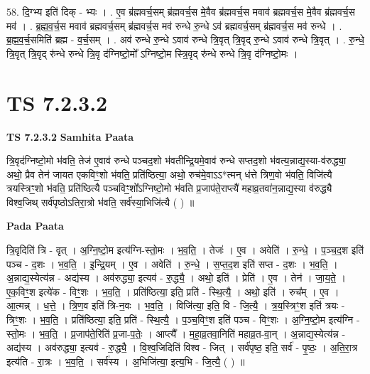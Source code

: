 \documentclass[17pt]{extarticle}
\begin{document}
58. दि॒ग्भ्य इति॑ दिक् - भ्यः । . ए॒व ब्र॑ह्मवर्च॒सम् ब्र॑ह्मवर्च॒स मे॒वैव ब्र॑ह्मवर्च॒स मवाव॑ ब्रह्मवर्च॒स मे॒वैव ब्र॑ह्मवर्च॒स मव॑ । . ब्र॒ह्म॒व॒र्च॒स मवाव॑ ब्रह्मवर्च॒सम् ब्र॑ह्मवर्च॒स मव॑ रुन्धे रु॒न्धे ऽव॑ ब्रह्मवर्च॒सम् ब्र॑ह्मवर्च॒स मव॑ रुन्धे । . ब्र॒ह्म॒व॒र्च॒समिति॑ ब्रह्म - व॒र्च॒सम् । . अव॑ रुन्धे रु॒न्धे ऽवाव॑ रुन्धे त्रि॒वृत् त्रि॒वृद् रु॒न्धे ऽवाव॑ रुन्धे त्रि॒वृत् । . रु॒न्धे॒ त्रि॒वृत् त्रि॒वृद् रु॑न्धे रुन्धे त्रि॒वृ द॑ग्निष्टो॒मो᳚ ऽग्निष्टो॒म स्त्रि॒वृद् रु॑न्धे रुन्धे त्रि॒वृ द॑ग्निष्टो॒मः । \newline
\pagebreak
{}

\section{ TS 7.2.3.2 }

\textbf{TS 7.2.3.2 } \newline
\textbf{Samhita Paata} \newline

त्रि॒वृद॑ग्निष्टो॒मो भ॑वति॒ तेज॑ ए॒वाव॑ रुन्धे पञ्चद॒शो भ॑वतीन्द्रि॒यमे॒वाव॑ रुन्धे सप्तद॒शो भ॑वत्य॒न्नाद्य॒स्या-व॑रुद्ध्या॒ अथो॒ प्रैव तेन॑ जायत एकविꣳ॒॒शो भ॑वति॒ प्रति॑ष्ठित्या॒ अथो॒ रुच॑मे॒वाऽऽ*त्मन् ध॑त्ते त्रिण॒वो भ॑वति॒ विजि॑त्यै त्रयस्त्रिꣳ॒॒शो भ॑वति॒ प्रति॑ष्ठित्यै पञ्चविꣳ॒॒शो᳚ऽग्निष्टो॒मो भ॑वति प्र॒जाप॑ते॒राप्त्यै॑ महाव्र॒तवा॑न॒न्नाद्य॒स्या व॑रुद्ध्यै विश्व॒जिथ् सर्व॑पृष्ठोऽतिरा॒त्रो भ॑वति॒ सर्व॑स्या॒भिजि॑त्यै ( ) ॥ \newline

\textbf{Pada Paata} \newline

त्रि॒वृदिति॑ त्रि - वृत् । अ॒ग्नि॒ष्टो॒म इत्य॑ग्नि-स्तो॒मः । भ॒व॒ति॒ । तेजः॑ । ए॒व । अवेति॑ । रु॒न्धे॒ । प॒ञ्च॒द॒श इति॑ पञ्च - द॒शः । भ॒व॒ति॒ । इ॒न्द्रि॒यम् । ए॒व । अवेति॑ । रु॒न्धे॒ । स॒प्त॒द॒श इति॑ सप्त - द॒शः । भ॒व॒ति॒ । अ॒न्नाद्य॒स्येत्य॑न्न - अद्य॑स्य । अव॑रुद्ध्या॒ इत्यव॑ - रु॒द्ध्यै॒ । अथो॒ इति॑ । प्रेति॑ । ए॒व । तेन॑ । जा॒य॒ते॒ । ए॒क॒विꣳ॒॒श इत्ये॑क - विꣳ॒॒शः । भ॒व॒ति॒ । प्रति॑ष्ठित्या॒ इति॒ प्रति॑ - स्थि॒त्यै॒ । अथो॒ इति॑ । रुच᳚म् । ए॒व । आ॒त्मन्न् । ध॒त्ते॒ । त्रि॒ण॒व इति॑ त्रि-न॒वः । भ॒व॒ति॒ । विजि॑त्या॒ इति॒ वि - जि॒त्यै॒ । त्र॒य॒स्त्रिꣳ॒॒श इति॑ त्रयः - त्रिꣳ॒॒शः । भ॒व॒ति॒ । प्रति॑ष्ठित्या॒ इति॒ प्रति॑ - स्थि॒त्यै॒ । प॒ञ्च॒विꣳ॒॒श इति॑ पञ्च - विꣳ॒॒शः । अ॒ग्नि॒ष्टो॒म इत्य॑ग्नि - स्तो॒मः । भ॒व॒ति॒ । प्र॒जाप॑ते॒रिति॑ प्र॒जा-प॒तेः॒ । आप्त्यै᳚ । म॒हा॒व्र॒तवा॒निति॑ महाव्र॒त-वा॒न् । अ॒न्नाद्य॒स्येत्य॑न्न - अद्य॑स्य । अव॑रुद्ध्या॒ इत्यव॑ - रु॒द्ध्यै॒ । वि॒श्व॒जिदिति॑ विश्व - जित् । सर्व॑पृष्ठ॒ इति॒ सर्व॑ - पृ॒ष्ठः॒ । अ॒ति॒रा॒त्र इत्य॑ति - रा॒त्रः । भ॒व॒ति॒ । सर्व॑स्य । अ॒भिजि॑त्या॒ इत्य॒भि - जि॒त्यै॒ ( ) ॥  \newline
\end{document}
